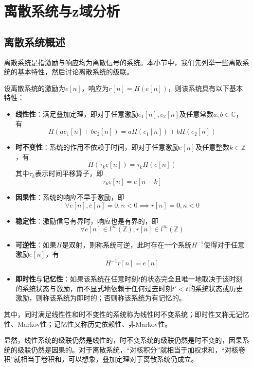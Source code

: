 \section{离散系统与z域分析}\label{sec:Discrete_System_z_Analysis}


\subsection{离散系统概述}\label{sub:discrete_system_overview}

离散系统是指激励与响应均为离散信号的系统。本小节中，我们先列举一些离散系统的基本特性，然后讨论离散系统的级联。

\begin{definition}
    设离散系统的激励为$e[n]$，响应为$r[n]=H(e[n])$，则该系统具有以下基本特性：
    \begin{itemize}
        \item \textbf{线性性}：满足叠加定理，即对于任意激励$e_1[n],e_2[n]$及任意常数$a,b\in\mathbb{C}$，有
        \[H(ae_1[n]+be_2[n])=aH(e_1[n])+bH(e_2[n])\]
        \item \textbf{时不变性}：系统的作用不依赖于时间，即对于任意激励$e[n]$及任意整数$k\in\mathbb{Z}$，有
        \[H(\tau_k e[n])=\tau_k H(e[n])\]
        其中$\tau_k$表示时间平移算子，即
        $$\tau_k e[n]=e[n-k]$$
        \item \textbf{因果性}：系统的响应不早于激励，即
        \[\forall e[n],e[n]=0,n<0\implies r[n]=0,n<0\]
        \item \textbf{稳定性}：激励信号有界时，响应也是有界的，即
        \[\forall e[n]\in l^{\infty}(\mathbb{Z}),r[n]\in l^{\infty}(\mathbb{Z})\]
        \item \textbf{可逆性}：如果$H$是双射，则称系统可逆，此时存在一个系统$H^{-1}$使得对于任意激励$e[n]$，有
        \[H^{-1}r[n]=e[n]\]
        \item \textbf{即时性}与\textbf{记忆性}：如果该系统在任意时刻$t$的状态完全且唯一地取决于该时刻的系统状态与激励，而不显式地依赖于任何过去时刻$t'<t$的系统状态或历史激励，则称该系统为即时的；否则称该系统为有记忆的。
    \end{itemize}
    其中，同时满足线性性和时不变性的系统称为线性时不变系统；即时性又称无记忆性、Markov性；记忆性又称历史依赖性、非Markov性。
\end{definition}

显然，线性系统的级联仍然是线性的，时不变系统的级联仍然是时不变的，因果系统的级联仍然是因果的。对于离散系统，“对核积分”就相当于加权求和，“对核卷积”就相当于卷积和，可以想象，叠加定理对于离散系统仍成立。

